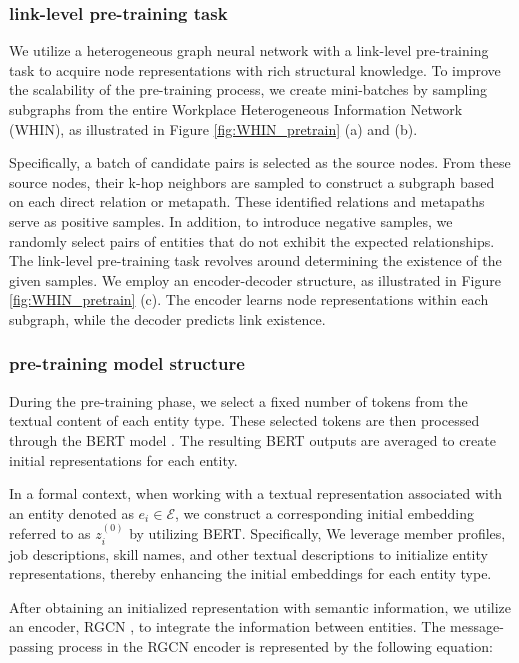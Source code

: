 \subsubsection{link-level pre-training task}
\label{link-level pre-training task}
We utilize a heterogeneous graph neural network with a link-level pre-training task to acquire node representations with rich structural knowledge. To improve the scalability of the pre-training process, we create mini-batches by sampling subgraphs from the entire Workplace Heterogeneous Information Network (WHIN), as illustrated in Figure \ref{fig:WHIN_pretrain} (a) and (b).

Specifically, a batch of candidate pairs is selected as the source nodes. From these source nodes, their k-hop neighbors are sampled to construct a subgraph based on each direct relation or metapath. These identified relations and metapaths serve as positive samples. In addition, to introduce negative samples, we randomly select pairs of entities that do not exhibit the expected relationships. The link-level pre-training task revolves around determining the existence of the given samples. We employ an encoder-decoder structure, as illustrated in Figure \ref{fig:WHIN_pretrain} (c). The encoder learns node representations within each subgraph, while the decoder predicts link existence.

\subsubsection{pre-training model structure}
\label{pre-training model structure}

During the pre-training phase, we select a fixed number of tokens from the textual content of each entity type. These selected tokens are then processed through the BERT model \cite{devlin2018bert}. The resulting BERT outputs are averaged to create initial representations for each entity.

In a formal context, when working with a textual representation associated with an entity denoted as $e_i\in \mathcal{E}$, we construct a corresponding initial embedding referred to as $z_i^{(0)}$ by utilizing BERT. Specifically, We leverage member profiles, job descriptions, skill names, and other textual descriptions to initialize entity representations, thereby enhancing the initial embeddings for each entity type.

After obtaining an initialized representation with semantic information, we utilize an encoder, RGCN \cite{schlichtkrull2018modeling}, to integrate the information between entities. The message-passing process in the RGCN encoder is represented by the following equation:

